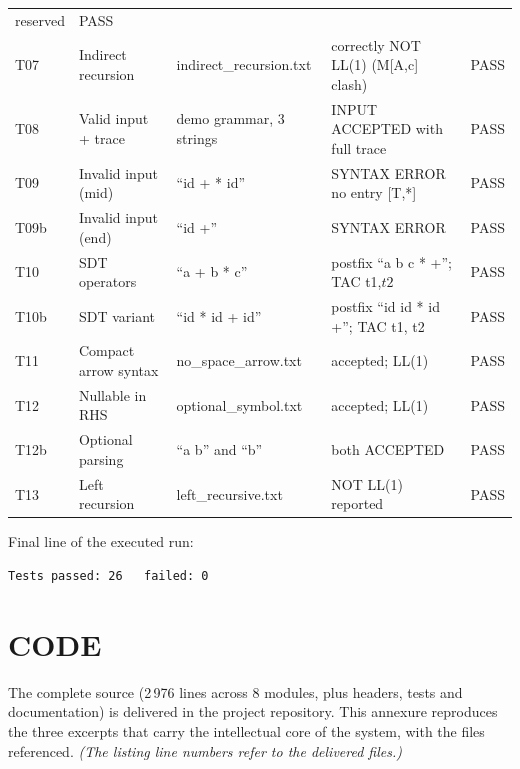 \documentclass[12pt,a4paper,oneside,openany]{report}
\begin{document}
\begin{longtable}{@{}p{0.9cm}p{2.5cm}p{3.2cm}>{\raggedright\arraybackslash}p{3.9cm}>{\raggedright\arraybackslash}p{1.5cm}@{}}
  reserved & PASS \\
  T07 & Indirect recursion & indirect\_recursion.txt & correctly NOT
  LL(1) (M[A,c] clash) & PASS \\
  T08 & Valid input + trace & demo grammar, 3 strings & INPUT ACCEPTED
  with full trace & PASS \\
  T09 & Invalid input (mid) & ``id + * id'' & SYNTAX ERROR no entry [T,*] &
  PASS \\
  T09b & Invalid input (end) & ``id +'' & SYNTAX ERROR & PASS \\
  T10 & SDT operators & ``a + b * c'' & postfix ``a b c * +''; TAC t1,$t2$ &
  PASS \\
  T10b & SDT variant & ``id * id + id'' & postfix ``id id * id +''; TAC
  t1, t2 & PASS \\
  T11 & Compact arrow syntax & no\_space\_arrow.txt & accepted; LL(1) &
  PASS \\
  T12 & Nullable in RHS & optional\_symbol.txt & accepted; LL(1) & PASS \\
  T12b & Optional parsing & ``a b'' and ``b'' & both ACCEPTED & PASS \\
  T13 & Left recursion & left\_recursive.txt & NOT LL(1) reported & PASS \\
  \bottomrule
\end{longtable}
\noindent Final line of the executed run:
\begin{lstlisting}[style=outputcode]
  Tests passed: 26   failed: 0
\end{lstlisting}

\chapter{CODE}
\label{annex:code}

The complete source (2\,976 lines across 8 modules, plus headers, tests
and documentation) is delivered in the project repository. This annexure
reproduces the three excerpts that carry the intellectual core of the
system, with the files referenced. \emph{(The listing line numbers refer
to the delivered files.)}
\end{document}

